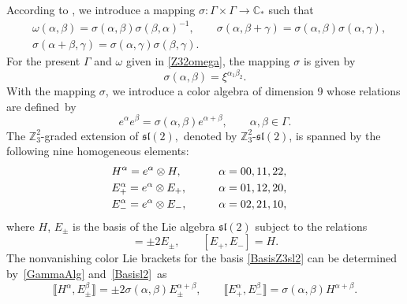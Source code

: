 \documentclass[pdftex]{sigma}
\numberwithin{equation}{section}
\theoremstyle{definition}
\def\nn{\notag}
\def\sl{\mathfrak{sl}}
\def\Zsl{$\mathbb{Z}_3^2$-$\sl(2)$}
\begin{document}
According to \cite{scheu}, we introduce a mapping $ \sigma\colon \Gamma \times \Gamma \to
\mathbb{C}_*$ such that
\begin{align*}
	&\omega(\alpha,\beta) = \sigma(\alpha,\beta) \sigma(\beta,\alpha)^{-1},
	\qquad
	\sigma(\alpha,\beta+\gamma) = \sigma(\alpha,\beta) \sigma(\alpha,\gamma),
	\\
	& \sigma(\alpha+\beta,\gamma) = \sigma(\alpha,\gamma) \sigma(\beta,\gamma).
\end{align*}
For the present $\Gamma$ and $ \omega $ given in \eqref{Z32omega}, the mapping $\sigma $ is given by
\begin{equation*}
	\sigma(\alpha,\beta) = \xi^{\alpha_1 \beta_2}.
\end{equation*}
With the mapping $\sigma$, we introduce a color algebra of dimension 9 whose relations are defined~by%
\begin{equation}
	e^{\alpha} e^{\beta} = \sigma(\alpha,\beta) e^{\alpha+\beta}, \qquad \alpha, \beta \in \Gamma.
	\label{GammaAlg}
\end{equation}
The $\mathbb{Z}_3^2$-graded extension of $\sl(2),$ denoted by \Zsl, is spanned by the following nine homogeneous elements:
\begin{alignat}{3}
	&H^{\alpha}= e^{\alpha} \otimes H, \qquad&& \alpha= 00, 11, 22,&
	\nn \\
	&E_+^{\alpha}= e^{\alpha} \otimes E_+, \qquad&& \alpha= 01, 12, 20,&
	\nn \\
	&E_-^{\alpha}= e^{\alpha} \otimes E_-, \qquad&& \alpha= 02, 21, 10,&
	\label{BasisZ3sl2}
\end{alignat}
where $ H$, $E_{\pm} $ is the basis of the Lie algebra $\sl(2)$ subject to the relations
\begin{equation}
	[H, E_{\pm}] = \pm 2 E_{\pm}, \qquad
	[E_+, E_-] = H. \label{Basisl2}
\end{equation}
The nonvanishing color Lie brackets for the basis \eqref{BasisZ3sl2} can be determined by~\eqref{GammaAlg} and~\eqref{Basisl2}~as
\begin{equation}
	\bigl\llbracket H^{\alpha}, E_{\pm}^{\beta} \bigr\rrbracket = \pm 2 \sigma(\alpha,\beta)E_{\pm}^{\alpha+\beta},
	\qquad
	\bigl\llbracket E_+^{\alpha}, E_-^{\beta} \bigr\rrbracket = \sigma(\alpha,\beta) H^{\alpha+\beta}.
	\label{Z32slrelations}
\end{equation}
\end{document}

